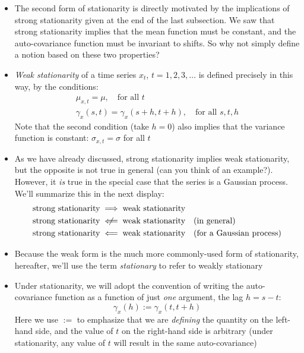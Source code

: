 \documentclass{article}
\begin{document}
\begin{itemize}
\item The second form of stationarity is directly motivated by the implications
  of strong stationarity given at the end of the last subsection. We saw that
  strong stationarity implies that the mean function must be constant, and the
  auto-covariance function must be invariant to shifts. So why not simply
  define a notion based on these two properties?

\item \emph{Weak stationarity} of a time series $x_t$, $t = 1,2,3,\dots$ is
  defined precisely in this way, by the conditions: 
 \begin{gather*}
  \mu_{x,t} = \mu, \quad \text{for all $t$} \\
  \gamma_x(s,t) = \gamma_x(s+h, t+h), \quad \text{for all $s,t,h$} 
  \end{gather*}
  Note that the second condition (take $h=0$) also implies that the variance
  function is constant: $\sigma_{x,t} = \sigma$ for all $t$

\item As we have already discussed, strong stationarity implies weak
  stationarity, but the opposite is not true in general (can you think of an 
  example?). However, it \emph{is} true in the special case that the series is a 
  Gaussian process. We'll summarize this in the next display:
  \begin{align*}
  \text{strong stationarity} &\implies \text{weak stationarity} \\
  \text{strong stationarity} &\centernot\impliedby \text{weak stationarity}   
  \quad \text{(in general)} \\
  \text{strong stationarity} &\impliedby \text{weak stationarity}  
  \quad \text{(for a Gaussian process)} 
  \end{align*}

\item Because the weak form is the much more commonly-used form of stationarity, 
  hereafter, we'll use the term \emph{stationary} to refer to weakly stationary

\item Under stationarity, we will adopt the convention of writing the
  auto-covariance function as a function of just \emph{one} argument, the lag
  $h = s-t$: 
  \[
  \gamma_x(h) := \gamma_x(t, t+h)
  \]
  Here we use $:=$ to emphasize that we are \emph{defining} the quantity on the
  left-hand side, and the value of $t$ on the right-hand side is arbitrary
  (under stationarity, any value of $t$ will result in the same auto-covariance) 


\end{itemize}
\end{document}
